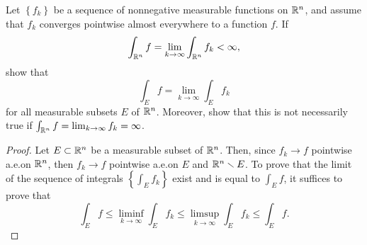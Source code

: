 \begin{problem}
Let $\left\{f_k\right\}$ be a sequence of nonnegative measurable functions
on $\mathbb{R}^n$, and assume that $f_k$ converges pointwise almost everywhere to
a function $f$. If
\[
\int_{\mathbb{R}^n} f=\lim_{k\to\infty}\int_{\mathbb{R}^n} f_k<\infty,
\]
show that
\[
\int_E f=\lim_{k\to\infty}\int_E f_k
\]
for all measurable subsets $E$ of $\mathbb{R}^n$. Moreover, show that this is not
necessarily true if $\int_{\mathbb{R}^n} f=\lim_{k\to\infty} f_k=\infty$.
\end{problem}
\begin{proof}
Let $E\subset\mathbb{R}^n$ be a measurable subset of $\mathbb{R}^n$. Then, since
$f_k\to f$ pointwise a.e.\@ on $\mathbb{R}^n$, then $f_k\to f$ pointwise a.e.\@ on
$E$ and $\mathbb{R}^n\smallsetminus E$. To prove that the limit of the sequence
of integrals $\left\{\int_Ef_k\right\}$ exist and is equal to $\int_E f$,
it suffices to prove that
\begin{equation}
  \label{eq:prep:2:6}
\int_E
f\leq\liminf_{k\to\infty}\int_Ef_k\leq\limsup_{k\to\infty}\int_Ef_k\leq\int_E f.
\end{equation}


\end{proof}
